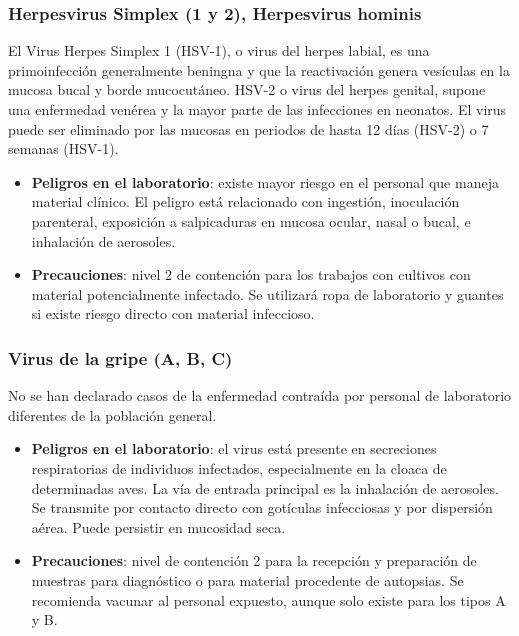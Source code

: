 \subsubsection{Herpesvirus Simplex (1 y 2), Herpesvirus hominis}
El Virus Herpes Simplex 1 (HSV-1), o virus del herpes labial, es una primoinfección generalmente beningna y que la reactivación genera vesículas en la mucosa bucal y borde mucocutáneo. HSV-2 o virus del herpes genital, supone una enfermedad venérea y la mayor parte de las infecciones en neonatos. El virus puede ser eliminado por las mucosas en periodos de hasta 12 días (HSV-2) o 7 semanas (HSV-1).
\begin{itemize}[itemsep=0pt,parsep=0pt,topsep=0pt,partopsep=0pt]
    \item \textbf{Peligros en el laboratorio}: existe mayor riesgo en el personal que maneja material clínico. El peligro está relacionado con ingestión, inoculación parenteral, exposición a salpicaduras en mucosa ocular, nasal o bucal, e inhalación de aerosoles.
    \item \textbf{Precauciones}: nivel 2 de contención para los trabajos con cultivos con material potencialmente infectado. Se utilizará ropa de laboratorio y guantes si existe riesgo directo con material infeccioso.
\end{itemize}
\subsubsection{Virus de la gripe (A, B, C)}
No se han declarado casos de la enfermedad contraída por personal de laboratorio diferentes de la población general.
\begin{itemize}[itemsep=0pt,parsep=0pt,topsep=0pt,partopsep=0pt]
    \item \textbf{Peligros en el laboratorio}: el virus está presente en secreciones respiratorias de individuos infectados, especialmente en la cloaca de determinadas aves. La vía de entrada principal es la inhalación de aerosoles. Se transmite por contacto directo con gotículas infecciosas y por dispersión aérea. Puede persistir en mucosidad seca.
    \item \textbf{Precauciones}: nivel de contención 2 para la recepción y preparación de muestras para diagnóstico o para material procedente de autopsias. Se recomienda vacunar al personal expuesto, aunque solo existe para los tipos A y B.
\end{itemize}

